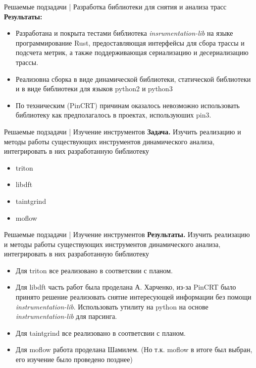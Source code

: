 \documentclass[10pt]{beamer}
\begin{document}
\begin{frame}{Решаемые подзадачи | Разработка библиотеки для снятия и анализа трасс}
    \textbf{Результаты:}
    \begin{itemize}
      \item Разработана и покрыта тестами библиотека \emph{insrumentation-lib} на языке программирование Rust, предоставляющая интерфейсы для сбора трассы и подсчета метрик, а также поддерживающая сериализацию и десериализацию трассы.
      \item Реализовна сборка в виде динамической библиотеки, статической библиотеки и в виде библиотеки для языков python2 и python3 
      \item По техническим (PinCRT) причинам оказалось невозможно использовать библиотеку как предполагалось в проектах, используюших pin3.
    \end{itemize}
\end{frame}

\begin{frame}{Решаемые подзадачи | Изучение инструментов }
    \textbf{Задача.} Изучить реализацию и методы работы существующих инструментов динамического анализа, интегрировать в них разработанную библиотеку
    \begin{itemize}
        \item triton
        \item libdft
        \item taintgrind
        \item moflow
    \end{itemize}
\end{frame}

\begin{frame}{Решаемые подзадачи | Изучение инструментов }
    \textbf{Результаты.} Изучить реализацию и методы работы существующих инструментов динамического анализа, интегрировать в них разработанную библиотеку
    \begin{itemize}
        \item Для triton все реализовано в соответсвии с планом.
        \item Для libdft часть работ была проделана А. Харченко, из-за PinCRT было принято решение реализовать снятие интересующей информации без помощи \emph{instrumentation-lib}. Использовать утилиту на python на основе \emph{instrumentation-lib} для парсинга.
        \item Для taintgrind все реализовано в соответсвии с планом.
        \item Для moflow работа проделана Шамилем. (Но т.к. moflow в итоге был выбран, его изучение было проведено позднее)
    \end{itemize}
\end{frame}
\end{document}
